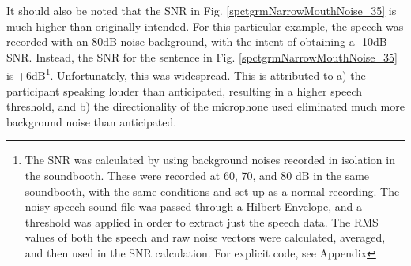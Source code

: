 It should also be noted that the SNR in Fig. \ref{spctgrmNarrowMouthNoise_35} is much higher than originally intended.  For this particular example, the speech was recorded with an 80dB noise background, with the intent of obtaining a -10dB SNR.  Instead, the SNR for the sentence in Fig. \ref{spctgrmNarrowMouthNoise_35} is +6dB\footnote{The SNR was calculated by using background noises recorded in isolation in the soundbooth.  These were recorded at 60, 70, and 80 dB in the same soundbooth, with the same conditions and set up as a normal recording.  The noisy speech sound file was passed through a Hilbert Envelope, and a threshold was applied in order to extract just the speech data.  The RMS values of both the speech and raw noise vectors were calculated, averaged, and then used in the SNR calculation.  For explicit code, see Appendix \DIFdelbegin {}\DIFdelend \DIFaddbegin {}\DIFaddend }.  Unfortunately, this was widespread. This is attributed to a) the participant speaking louder than anticipated, resulting in a higher speech threshold, and b) the directionality of the microphone used eliminated much more background noise than anticipated.

